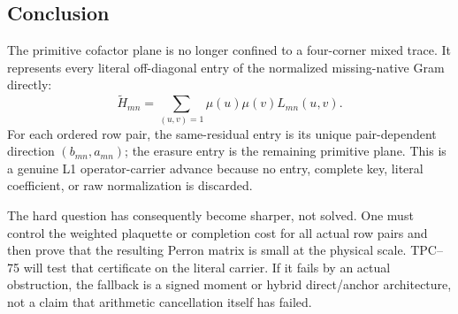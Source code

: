 \subsection{Conclusion}

The primitive cofactor plane is no longer confined to a four-corner mixed
trace.  It represents every literal off-diagonal entry of the normalized
missing-native Gram directly:
\[
 \widetilde H_{mn}
 =
 \sum_{(u,v)=1}\mu(u)\mu(v)L_{mn}(u,v).
\]
For each ordered row pair, the same-residual entry is its unique
pair-dependent direction \((b_{mn},a_{mn})\); the erasure entry is the
remaining primitive plane.  This is a genuine L1 operator-carrier advance
because no entry, complete key, literal coefficient, or raw normalization
is discarded.

The hard question has consequently become sharper, not solved.  One must
control the weighted plaquette or completion cost for all actual row
pairs and then prove that the resulting Perron matrix is small at the
physical scale.  TPC--75 will test that certificate on the literal
carrier.  If it fails by an actual obstruction, the fallback is a signed
moment or hybrid direct/anchor architecture, not a claim that arithmetic
cancellation itself has failed.

